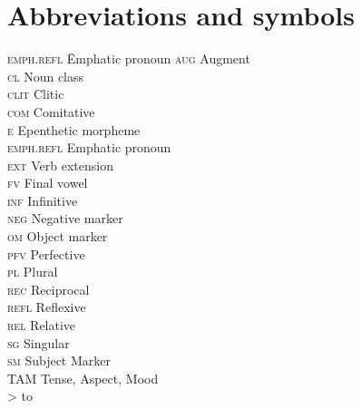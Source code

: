 \documentclass[output=paper,
            colorlinks, citecolor=brown
            ,draftmode
		  ]{langscibook}
\begin{document}
\section*{Abbreviations and symbols}
\begin{multicols}{2}
\begin{tabbing}
\textsc{emph.refl}\hspace{1ex}  \=  Emphatic pronoun\kill
\textsc{aug} \>    Augment\\
\textsc{cl} \>    Noun class\\
\textsc{clit} \>    Clitic\\
\textsc{com} \>    Comitative\\
\textsc{e} \>    Epenthetic morpheme\\
\textsc{emph.refl} \>    Emphatic pronoun\\
\textsc{ext} \>    Verb extension\\
\textsc{fv} \>    Final vowel\\
\textsc{inf} \>    Infinitive\\
\textsc{neg} \>    Negative marker\\
\textsc{om} \>    Object marker\\
\textsc{pfv} \>    Perfective\\
\textsc{pl} \>    Plural\\
\textsc{rec} \>    Reciprocal\\
\textsc{refl} \>    Reflexive\\
\textsc{rel} \>    Relative\\
\textsc{sg} \>    Singular\\
\textsc{sm} \>    Subject Marker\\
TAM \>   Tense, Aspect, Mood\\
> \>   to
\end{tabbing}
\end{multicols}


\sloppy\printbibliography[heading=subbibliography,notkeyword=this]
\end{document}
